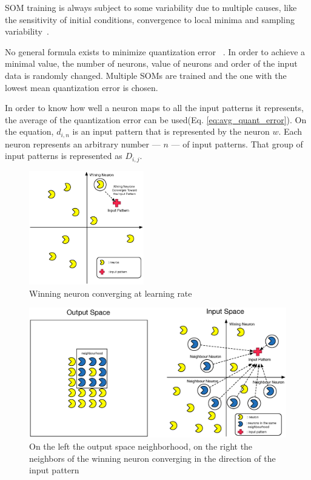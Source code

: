 SOM training is always subject to some variability due to multiple causes, like the sensitivity of initial conditions, convergence to local minima and sampling variability~\cite{Bodt}.

No general formula exists to minimize quantization error~\cite{Bodt} . In order to achieve a minimal value, the number of neurons, value of neurons and order of the input data is randomly changed. Multiple SOMs are trained and the one with the lowest mean quantization error is chosen.

In order to know how well a neuron maps to all the input patterns it represents, the average of the quantization error can be used(Eq. \ref{eq:avg_quant_error}). On the equation, $d_{i,n}$ is an input pattern that is represented by the neuron $w$. Each neuron represents an arbitrary number --- $n$ --- of input patterns. That group of input patterns is represented as $D_{i,j}$.
\par





\begin{figure}
  \begin{center}
    \includegraphics[width=5cm]{images/4_wining_neuron_converge.eps}
  \end{center}
  \caption{ Winning neuron converging at learning rate }
  \label{fig:4_wining_neuron_converge}
\end{figure}

\begin{figure}
  \begin{center}
    \includegraphics[width=12cm]{images/5_neighbours_converge.eps}
  \end{center}
  \caption{ On the left the output space neighborhood, on the right the neighbors of the winning neuron converging in the direction of the input pattern }
  \label{fig:5_neighbours_converge}
\end{figure}

